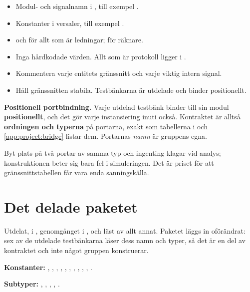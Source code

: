 \begin{itemize}
  \item Modul- och signalnamn i , till exempel .
  \item Konstanter i versaler, till exempel .
  \item {} och  för allt som är ledningar;  för
    räknare.
  \item Inga hårdkodade värden. Allt som är protokoll ligger i .
  \item Kommentera varje entitets gränssnitt och varje viktig intern signal.
  \item Håll gränssnitten stabila. Testbänkarna är utdelade och binder positionellt.
\end{itemize}

\begin{warning}
\textbf{Positionell portbindning.} Varje utdelad testbänk binder till sin modul \textbf{positionellt},
och det gör varje instansiering inuti  också. Kontraktet är alltså
\textbf{ordningen och typerna} på portarna, exakt som tabellerna i 
och \ref{app:project:bridge} listar dem. Portarnas \emph{namn} är gruppens egna.

Byt plats på två portar av samma typ och ingenting klagar vid analys; konstruktionen beter sig bara
fel i simuleringen. Det är priset för att gränssnittstabellen får vara enda sanningskälla.
\end{warning}

\section{Det delade paketet }
\label{app:project:candef}

Utdelat, i , genomgånget i , och läst av allt annat.
Paketet läggs in oförändrat: sex av de utdelade testbänkarna läser dess namn och typer, så det är en
del av kontraktet och inte något gruppen konstruerar.

\textbf{Konstanter:} , , ,
, , , , ,
, , .

\textbf{Subtyper:} , , , , .

